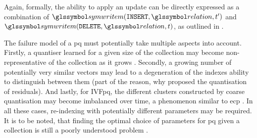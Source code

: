 Again, formally, the ability to apply an update can be directly expressed as a combination of $\symwritem(\mathtt{INSERT}, \relation, t^{\prime})$ and $ \symwritem(\mathtt{DELETE}, \relation, t)$, as outlined in .

The failure model of a \acrshort{pq} must potentially take multiple aspects into account. Firstly, a quantiser learned for a given size of the collection may become non-representative of the collection as it grows \cite{Liu:2020Online}. Secondly, a growing number of potentially very similar vectors may lead to a degeneration of the indexes ability to distinguish between them (part of the reason, why \cite{Jegou:2010Product} proposed the quantisation of residuals). And lastly, for IVF\acrshort{pq}, the different clusters constructed by coarse quantisation may become imbalanced over time, a phenomenon similar to e\acrshort{cp} \cite{Hojsgaard:2019Index}. In all these cases, re-indexing with potentially different parameters may be required. It is to be noted, that finding the optimal choice of parameters for \acrshort{pq} given a collection is still a poorly understood problem \cite{Ge:2014Optimized}.